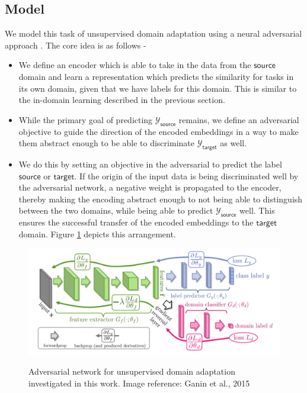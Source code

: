 \documentclass{sigkddExp}
\begin{document}
\subsection{Model}
We model this task of unsupervised domain adaptation using a neural adversarial approach \cite{ganin2015unsupervised}. The core idea is as follows - 
\begin{itemize}[topsep=0pt,itemsep=-1ex,partopsep=1ex,parsep=1ex]
    \item We define an encoder which is able to take in the data from the $\mathsf{source}$ domain and learn a representation which predicts the similarity for tasks in its own domain, given that we have labels for this domain. This is similar to the in-domain learning described in the previous section.
    \item While the primary goal of predicting $\mathcal{Y}_\mathsf{source}$ remains, we define an adversarial objective to guide the direction of the encoded embeddings in a way to make them abstract enough to be able to discriminate $\mathcal{Y}_\mathsf{target}$ as well.
    \item We do this by setting an objective in the adversarial to predict the label $\mathsf{source}$ or $\mathsf{target}$. If the origin of the input data is being discriminated well by the adversarial network, a negative weight is propagated to the encoder, thereby making the encoding abstract enough to not being able to distinguish between the two domains, while being able to predict $\mathcal{Y}_\mathsf{source}$ well. This ensures the successful transfer of the encoded embeddings to the $\mathsf{target}$ domain. Figure \ref{fig:adversary} depicts this arrangement.
\end{itemize}


\begin{figure}[h]
\centering
\includegraphics[width=\columnwidth]{img/adversary.png}
\label{fig:adversary}
\caption{Adversarial network for unsupervised domain adaptation investigated in this work. Image reference: Ganin et al., 2015 \protect\cite{ganin2015unsupervised}}
\end{figure}
    
\end{document}

